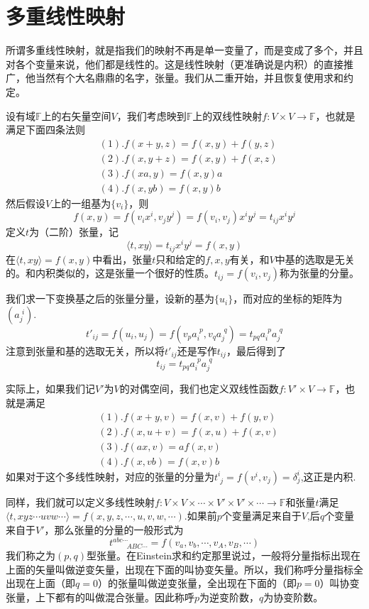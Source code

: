 \documentclass[11pt,a4paper,openany]{book}%
\theoremstyle{plain}%
\begin{document}
\section{多重线性映射}
所谓多重线性映射，就是指我们的映射不再是单一变量了，而是变成了多个，并且对各个变量来说，他们都是线性的。这是线性映射（更准确说是内积）的直接推广，他当然有个大名鼎鼎的名字，张量。我们从二重开始，并且恢复使用求和约定。

设有域$\mathbb{F}$上的右矢量空间$V$，我们考虑映到$\mathbb{F}$上的双线性映射$f:V\times V\rightarrow \mathbb{F}$，也就是满足下面四条法则
\begin{equation}
\begin{split}
&(1).f(x+y,z)=f(x,y)+f(y,z)\\
&(2).f(x,y+z)=f(x,y)+f(x,z)\\
&(3).f(xa,y)=f(x,y)a\\
&(4).f(x,yb)=f(x,y)b
\end{split}
\end{equation}
然后假设$V$上的一组基为$\{v_i\}$，则
\[
f(x,y)=f(v_ix^i,v_jy^j)=f(v_i,v_j)x^iy^j=t_{ij}x^iy^j
\]
定义$t$为{\kaishu （二阶）张量}，记
\[
\langle t,xy\rangle=t_{ij}x^iy^j=f(x,y)
\]
在$\langle t,xy\rangle=f(x,y)$中看出，张量$t$只和给定的$f,x,y$有关，和$V$中基的选取是无关的。和内积类似的，这是张量一个很好的性质。$t_{ij}=f(v_i,v_j)$称为张量的分量。

我们求一下变换基之后的张量分量，设新的基为$\{u_i\}$，而对应的坐标的矩阵为$(a^{\,\,i}_j)$.
\[
t'_{ij}=f(u_i,u_j)=f(v_pa^{\,\,p}_i,v_qa^{\,\,q}_j)=t_{pq}a^{\,\,p}_ia^{\,\,q}_j
\]
注意到张量和基的选取无关，所以将$t'_{ij}$还是写作$t_{ij}$，最后得到了
\[
t_{ij}=t_{pq}a^{\,\,p}_ia^{\,\,q}_j
\]

实际上，如果我们记$V'$为$V$的对偶空间，我们也定义双线性函数$f:V'\times V\rightarrow \mathbb{F}$，也就是满足
\begin{equation}
\label{张量}
\begin{split}
&(1).f(x+y,v)=f(x,v)+f(y,v)\\
&(2).f(x,u+v)=f(x,u)+f(x,v)\\
&(3).f(ax,v)=af(x,v)\\
&(4).f(x,vb)=f(x,v)b
\end{split}
\end{equation}
如果对于这个多线性映射，对应的张量的分量为$t^i_{\,\,j}=f(v^i,v_j)=\delta_j^i$,这正是内积.

同样，我们就可以定义多线性映射$f:V\times V  \times \cdots  \times V'\times V' \times\cdots \rightarrow \mathbb{F}$和张量$t$满足$\langle t,xyz\cdots uvw\cdots \rangle=f(x,y,z,\cdots,u,v,w,\cdots)$.如果前$p$个变量满足来自于$V$,后$q$个变量来自于$V'$，那么张量的分量的一般形式为
\[
t^{abc\cdots}_{\,\,\,\,\,\,\,\,\,\,\,\,ABC\cdots}=f(v_a,v_b,\cdots,v_A,v_B,\cdots)
\]
我们称之为$(p,q)$型张量。在Einstein求和约定那里说过，一般将分量指标出现在上面的矢量叫做逆变矢量，出现在下面的叫协变矢量。所以，我们称呼分量指标全出现在上面（即$q=0$）的张量叫做逆变张量，全出现在下面的（即$p=0$）叫协变张量，上下都有的叫做混合张量。因此称呼$p$为逆变阶数，$q$为协变阶数。
\end{document}
